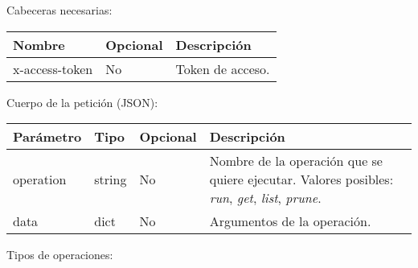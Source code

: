 		Cabeceras necesarias:
		\begin{table}[h!]
			\centering
	\begin{adjustbox}{max width=\textwidth}
			\begin{tabular}{|l|l|l|}
				\hline
				Nombre & Opcional & Descripción \\ \hline
				x-access-token & No & Token de acceso. \\ \hline
			\end{tabular}
\end{adjustbox}
		\end{table}
		
		Cuerpo de la petición (JSON):
		\begin{table}[!h]
			\centering
	\begin{adjustbox}{max width=\textwidth}
			\begin{tabular}{|l|l|l|l|}
				\hline
				Parámetro & Tipo & Opcional & Descripción \\ \hline
				operation & string & No & Nombre de la operación que se quiere ejecutar. Valores posibles: \textit{run}, \textit{get}, \textit{list}, \textit{prune}. \\ \hline
				data & dict & No & Argumentos de la operación. \\ \hline
			\end{tabular}
\end{adjustbox}
		\end{table}
	
		Tipos de operaciones:
